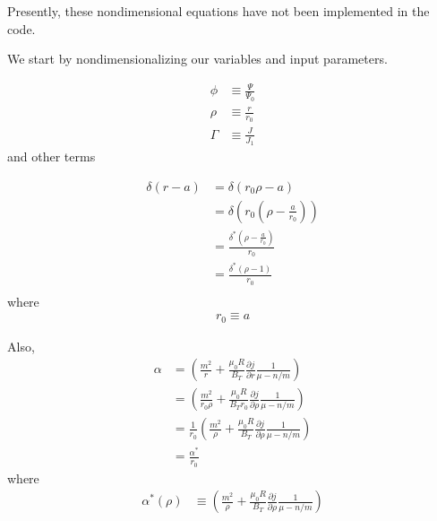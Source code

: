 \documentclass{article}
\begin{document}
Presently, these nondimensional equations have not been implemented in the code.

We start by nondimensionalizing our variables and input parameters.  

\begin{equation} \label{wessonCurrentProfile}
\begin{split}
\phi&\equiv\frac{\Psi}{\Psi_0} \\
\rho&\equiv\frac{r}{r_0} \\
\Gamma&\equiv\frac{J}{J_1}
\end{split} 
\end{equation} 
and other terms

\begin{equation} \label{wessonCurrentProfile}
\begin{split}
\delta(r-a) & = \delta(r_0 \rho - a) \\
& = \delta\left(r_0(\rho-\frac{a}{r_0})\right)\\
& = \frac{\delta^*\left(\rho-\frac{a}{r_0}\right)}{r_0}\\
& = \frac{\delta^*\left(\rho-1\right)}{r_0}\\
\end{split} 
\end{equation} 
where 
\begin{equation} \label{wessonCurrentProfile}
\begin{split}
r_0 \equiv a
\end{split} 
\end{equation} 

Also,
\begin{equation} \label{wessonCurrentProfile}
\begin{split}
\alpha&=\left( \frac{m^2}{r} +\frac{\mu_0 R}{B_T} \frac{\partial j}{\partial r}\frac{1}{\mu-n/m} \right) \\
&=\left( \frac{m^2}{r_0 \rho} +\frac{\mu_0 R}{B_T r_0} \frac{\partial j}{\partial \rho}\frac{1}{\mu-n/m} \right) \\
&=\frac{1}{r_0}\left( \frac{m^2}{ \rho} +\frac{\mu_0 R}{B_T} \frac{\partial j}{\partial \rho}\frac{1}{\mu-n/m} \right) \\
&=\frac{\alpha^*}{r_0}
\end{split} 
\end{equation} 
where
\begin{equation} \label{wessonCurrentProfile}
\begin{split}
\alpha^*(\rho)& \equiv \left( \frac{m^2}{ \rho} +\frac{\mu_0 R}{B_T} \frac{\partial j}{\partial \rho}\frac{1}{\mu-n/m} \right) \\
\end{split} 
\end{equation} 
\end{document}
